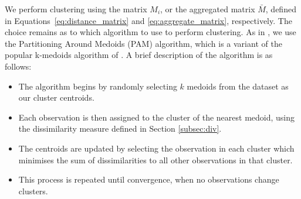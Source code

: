\documentclass[
  12pt]{article}
\newcommand{\eJSGa}[1]{\mathop{\mathrm{eJS}_{i, #1}^{\mathrm{G}_{\lambda}}}\nolimits}
\begin{document}
We perform clustering using the matrix $M_i$, or the aggregated matrix $\bar{M}$, defined in Equations~\eqref{eq:distance_matrix} and \eqref{eq:aggregate_matrix}, respectively.
The choice remains as to which algorithm to use to perform clustering. 
As in \citet{Vignotto2021}, we use the Partitioning Around Medoids (PAM) algorithm, which is a variant of the popular k-medoids algorithm of \citet{Kaufman1987}.
A brief description of the algorithm is as follows:
\begin{itemize} 
  \item The algorithm begins by randomly selecting $k$ medoids from the dataset as our cluster centroids. 
  \item Each observation is then assigned to the cluster of the nearest medoid, using the dissimilarity measure defined in Section \ref{subsec:div}.
  \item The centroids are updated by selecting the observation in each cluster which minimises the sum of dissimilarities to all other observations in that cluster.
  \item This process is repeated until convergence, when no observations change clusters.
\end{itemize}
\end{document}
